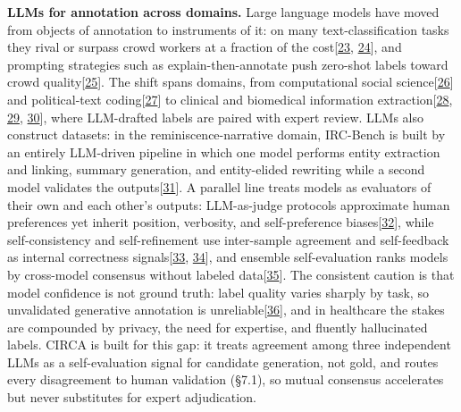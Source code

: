 \documentclass[3p,twocolumn]{elsarticle}
\begin{document}
\textbf{LLMs for annotation across domains.} Large language models have moved from objects of annotation to instruments of it: on many text-classification tasks they rival or surpass crowd workers at a fraction of the cost{[}\hyperref[r23]{23}, \hyperref[r24]{24}{]}, and prompting strategies such as explain-then-annotate push zero-shot labels toward crowd quality{[}\hyperref[r25]{25}{]}. The shift spans domains, from computational social science{[}\hyperref[r26]{26}{]} and political-text coding{[}\hyperref[r27]{27}{]} to clinical and biomedical information extraction{[}\hyperref[r28]{28}, \hyperref[r29]{29}, \hyperref[r30]{30}{]}, where LLM-drafted labels are paired with expert review. LLMs also construct datasets: in the reminiscence-narrative domain, IRC-Bench is built by an entirely LLM-driven pipeline in which one model performs entity extraction and linking, summary generation, and entity-elided rewriting while a second model validates the outputs{[}\hyperref[r31]{31}{]}. A parallel line treats models as evaluators of their own and each other's outputs: LLM-as-judge protocols approximate human preferences yet inherit position, verbosity, and self-preference biases{[}\hyperref[r32]{32}{]}, while self-consistency and self-refinement use inter-sample agreement and self-feedback as internal correctness signals{[}\hyperref[r33]{33}, \hyperref[r34]{34}{]}, and ensemble self-evaluation ranks models by cross-model consensus without labeled data{[}\hyperref[r35]{35}{]}. The consistent caution is that model confidence is not ground truth: label quality varies sharply by task, so unvalidated generative annotation is unreliable{[}\hyperref[r36]{36}{]}, and in healthcare the stakes are compounded by privacy, the need for expertise, and fluently hallucinated labels. CIRCA is built for this gap: it treats agreement among three independent LLMs as a self-evaluation signal for candidate generation, not gold, and routes every disagreement to human validation (§7.1), so mutual consensus accelerates but never substitutes for expert adjudication.
\end{document}

